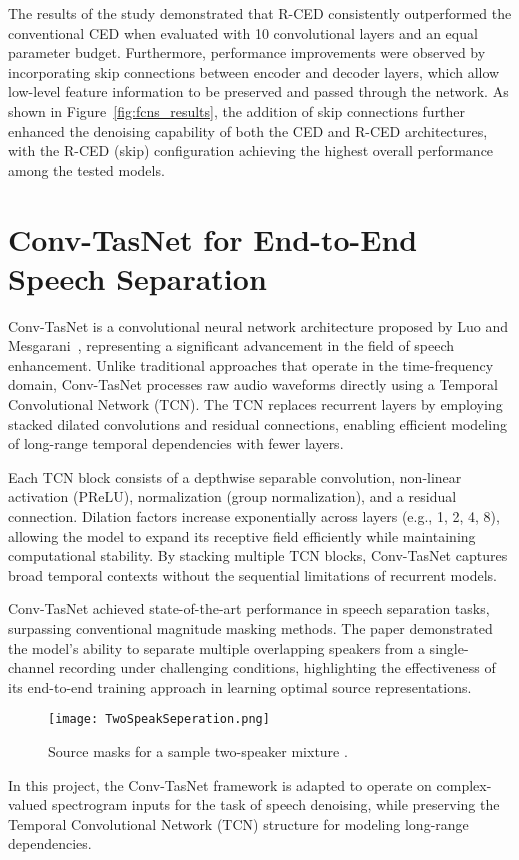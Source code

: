 The results of the study demonstrated that R-CED consistently outperformed the conventional CED when evaluated with 10 convolutional layers and an equal parameter budget. Furthermore, performance improvements were observed by incorporating skip connections between encoder and decoder layers, which allow low-level feature information to be preserved and passed through the network. As shown in Figure~\ref{fig:fcns_results}, the addition of skip connections further enhanced the denoising capability of both the CED and R-CED architectures, with the R-CED (skip) configuration achieving the highest overall performance among the tested models.


\section{Conv-TasNet for End-to-End Speech Separation}
\label{sec:convtasnet_lit_review}

Conv-TasNet is a convolutional neural network architecture proposed by Luo and Mesgarani~\cite{luo2019conv}, representing a significant advancement in the field of speech enhancement. Unlike traditional approaches that operate in the time-frequency domain, Conv-TasNet processes raw audio waveforms directly using a Temporal Convolutional Network (TCN). The TCN replaces recurrent layers by employing stacked dilated convolutions and residual connections, enabling efficient modeling of long-range temporal dependencies with fewer layers.

Each TCN block consists of a depthwise separable convolution, non-linear activation (PReLU), normalization (group normalization), and a residual connection. Dilation factors increase exponentially across layers (e.g., 1, 2, 4, 8), allowing the model to expand its receptive field efficiently while maintaining computational stability. By stacking multiple TCN blocks, Conv-TasNet captures broad temporal contexts without the sequential limitations of recurrent models.

Conv-TasNet achieved state-of-the-art performance in speech separation tasks, surpassing conventional magnitude masking methods. The paper demonstrated the model's ability to separate multiple overlapping speakers from a single-channel recording under challenging conditions, highlighting the effectiveness of its end-to-end training approach in learning optimal source representations.

\begin{figure}[H]
    \centering
    \texttt{[image: TwoSpeakSeperation.png]}
    \caption{Source masks for a sample two-speaker mixture \cite{luo2019conv}.}
    \label{fig:convtasnet}
\end{figure}

In this project, the Conv-TasNet framework is adapted to operate on complex-valued spectrogram inputs for the task of speech denoising, while preserving the Temporal Convolutional Network (TCN) structure for modeling long-range dependencies.

